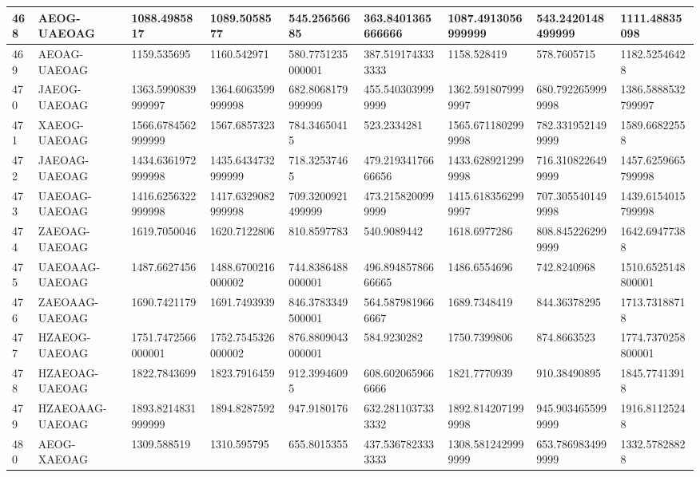{\begin{longtable}{|l|l|l|l|l|l|l|l|l|}
        468 & AEOG-UAEOAG & 1088.4985817 & 1089.5058577 & 545.25656685 & 363.8401365666666 & 1087.4913056999999 & 543.2420148499999 & 1111.48835098 \\ \hline
        469 & AEOAG-UAEOAG & 1159.535695 & 1160.542971 & 580.7751235000001 & 387.5191743333333 & 1158.528419 & 578.7605715 & 1182.52546428 \\ \hline
        470 & JAEOG-UAEOAG & 1363.5990839999997 & 1364.6063599999998 & 682.8068179999999 & 455.5403039999999 & 1362.5918079999997 & 680.7922659999998 & 1386.5888532799997 \\ \hline
        471 & XAEOG-UAEOAG & 1566.6784562999999 & 1567.6857323 & 784.34650415 & 523.2334281 & 1565.6711802999998 & 782.3319521499999 & 1589.66822558 \\ \hline
        472 & JAEOAG-UAEOAG & 1434.6361972999998 & 1435.6434732999999 & 718.32537465 & 479.21934176666656 & 1433.6289212999998 & 716.3108226499999 & 1457.6259665799998 \\ \hline
        473 & UAEOAG-UAEOAG & 1416.6256322999998 & 1417.6329082999998 & 709.3200921499999 & 473.2158200999999 & 1415.6183562999997 & 707.3055401499998 & 1439.6154015799998 \\ \hline
        474 & ZAEOAG-UAEOAG & 1619.7050046 & 1620.7122806 & 810.8597783 & 540.9089442 & 1618.6977286 & 808.8452262999999 & 1642.69477388 \\ \hline
        475 & UAEOAAG-UAEOAG & 1487.6627456 & 1488.6700216000002 & 744.8386488000001 & 496.89485786666665 & 1486.6554696 & 742.8240968 & 1510.6525148800001 \\ \hline
        476 & ZAEOAAG-UAEOAG & 1690.7421179 & 1691.7493939 & 846.3783349500001 & 564.5879819666667 & 1689.7348419 & 844.36378295 & 1713.73188718 \\ \hline
        477 & HZAEOG-UAEOAG & 1751.7472566000001 & 1752.7545326000002 & 876.8809043000001 & 584.9230282 & 1750.7399806 & 874.8663523 & 1774.7370258800001 \\ \hline
        478 & HZAEOAG-UAEOAG & 1822.7843699 & 1823.7916459 & 912.39946095 & 608.6020659666666 & 1821.7770939 & 910.38490895 & 1845.77413918 \\ \hline
        479 & HZAEOAAG-UAEOAG & 1893.8214831999999 & 1894.8287592 & 947.9180176 & 632.2811037333332 & 1892.8142071999998 & 945.9034655999999 & 1916.81125248 \\ \hline
        480 & AEOG-XAEOAG & 1309.588519 & 1310.595795 & 655.8015355 & 437.5367823333333 & 1308.5812429999999 & 653.7869834999999 & 1332.57828828 \\ \hline

\end{longtable}}

